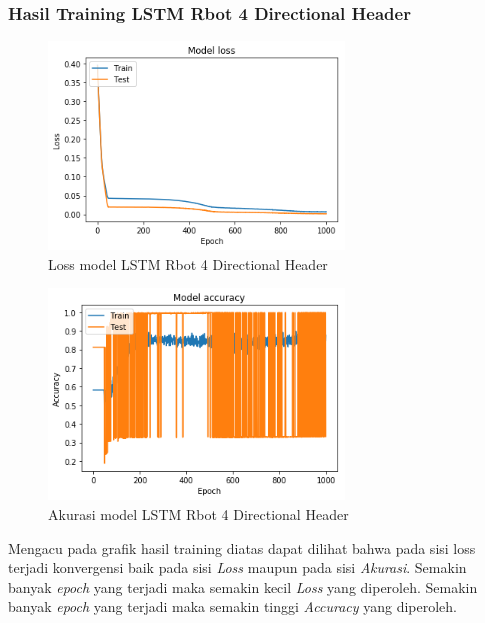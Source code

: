 \documentclass[./skripsi.tex]{subfiles}
\begin{document}
\subsubsection{Hasil Training LSTM Rbot 4 Directional Header}
\begin{figure}%
    \centering
    \includegraphics[width=0.7\textwidth]{public/assets/img/lstm4_rbot_loss.png}
    \caption{Loss model LSTM Rbot 4 Directional Header}
    \label{fig:lstm4_rbot_loss}
\end{figure}

\begin{figure}%
    \centering
    \includegraphics[width=0.7\textwidth]{public/assets/img/lstm4_rbot_acc.png}
    \caption{Akurasi model LSTM Rbot 4 Directional Header}
    \label{fig:lstm4_rbot_acc}
\end{figure}

\par Mengacu pada grafik hasil training diatas dapat dilihat bahwa pada sisi loss terjadi konvergensi baik pada sisi \textit{Loss} maupun pada sisi \textit{Akurasi}. Semakin banyak \textit{epoch} yang terjadi maka semakin kecil \textit{Loss} yang diperoleh. Semakin banyak \textit{epoch} yang terjadi maka semakin tinggi \textit{Accuracy} yang diperoleh.
\end{document}
